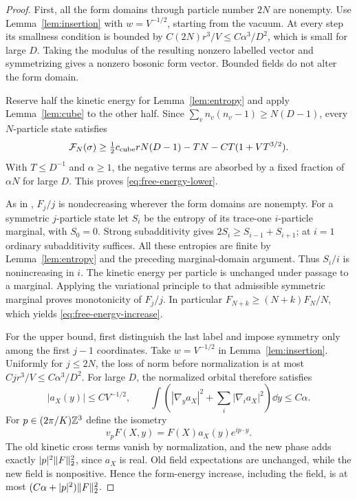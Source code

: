 \begin{proof}
First, all the form domains through particle number $2N$ are nonempty.
Use Lemma~\ref{lem:insertion} with $w=V^{-1/2}$, starting from the
vacuum. At every step its smallness condition is bounded by
$C(2N)r^3/V\le C\alpha^3/D^2$, which is small for large $D$.
Taking the modulus of the resulting nonzero labelled vector and
symmetrizing gives a nonzero bosonic form vector. Bounded fields do not
alter the form domain.

Reserve half the kinetic energy for Lemma~\ref{lem:entropy} and apply
Lemma~\ref{lem:cube} to the other half. Since
$\sum_vn_v(n_v-1)\ge N(D-1)$, every $N$-particle state satisfies
\[
 \mathcal F_N(\sigma)\ge
 \tfrac12c_{\rm cube}rN(D-1)-TN-CT(1+VT^{3/2}).
\]
With $T\le D^{-1}$ and $\alpha\ge1$, the negative terms are
absorbed by a fixed fraction of $\alpha N$ for large $D$. This proves
\eqref{eq:free-energy-lower}.

As in \citet[Section~3, ``Particle-number free-energy bounds'']{B},
$F_j/j$ is nondecreasing wherever the form domains are nonempty.
For a symmetric $j$-particle state let $S_i$ be the entropy of its
trace-one $i$-particle marginal, with $S_0=0$. Strong subadditivity
\citep{LiebRuskai1973Entropy} gives
$2S_i\ge S_{i-1}+S_{i+1}$; at $i=1$ ordinary subadditivity
suffices. All these entropies are finite by Lemma~\ref{lem:entropy}
and the preceding marginal-domain argument. Thus $S_i/i$ is
nonincreasing in $i$. The kinetic energy per particle is unchanged
under passage to a marginal. Applying the variational principle to
that admissible symmetric marginal proves monotonicity of $F_j/j$.
In particular
$F_{N+k}\ge(N+k)F_N/N$, which yields
\eqref{eq:free-energy-increase}.

For the upper bound, first distinguish the last label and impose symmetry
only among the first $j-1$ coordinates. Take $w=V^{-1/2}$ in
Lemma~\ref{lem:insertion}. Uniformly for $j\le2N$, the loss of norm
before normalization is at most
$Cjr^3/V\le C\alpha^3/D^2$. For large $D$, the normalized
orbital therefore satisfies
\begin{equation}\label{eq:constant-insertion}
 |a_X(y)|\le CV^{-1/2},\qquad
 \int\left(|\nabla_ya_X|^2+\sum_i|\nabla_i a_X|^2\right)\dd y
 \le C\alpha.
\end{equation}
For $p\in(2\pi/K)\mathbb Z^3$ define the isometry
\[
 v_pF(X,y)=F(X)a_X(y)e^{ip\cdot y}.
\]
The old kinetic cross terms vanish by normalization, and the new phase
adds exactly $|p|^2\lVert F\rVert_2^2$, since $a_X$ is real. Old field
expectations are unchanged, while the new field is nonpositive. Hence
the form-energy increase, including the field, is at most
$(C\alpha+|p|^2)\lVert F\rVert_2^2$.


\end{proof}
